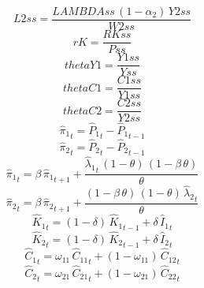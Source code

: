 \begin{dmath*}
L2ss = \frac{{LAMBDAss}\, \left(1-{{\alpha_{2}}}\right)\, {Y2ss}}{{W2ss}}
\end{dmath*}
\begin{dmath*}
rK = \frac{{RKss}}{{Pss}}
\end{dmath*}
\begin{dmath*}
thetaY1 = \frac{{Y1ss}}{{Yss}}
\end{dmath*}
\begin{dmath*}
thetaC1 = \frac{{C1ss}}{{Y1ss}}
\end{dmath*}
\begin{dmath*}
thetaC2 = \frac{{C2ss}}{{Y2ss}}
\end{dmath*}
\begin{dmath}
{{\hat{\pi}_{1}}}_{t}={{\hat{P}_{1}}}_{t}-{{\hat{P}_{1}}}_{t-1}
\end{dmath}
\begin{dmath}
{{\hat{\pi}_{2}}}_{t}={{\hat{P}_{2}}}_{t}-{{\hat{P}_{2}}}_{t-1}
\end{dmath}
\begin{dmath}
{{\hat{\pi}_{1}}}_{t}={{\beta}}\, {{\hat{\pi}_{1}}}_{t+1}+\frac{{{\hat{\lambda}_{1}}}_{t}\, \left(1-{{\theta}}\right)\, \left(1-{{\beta}}\, {{\theta}}\right)}{{{\theta}}}
\end{dmath}
\begin{dmath}
{{\hat{\pi}_{2}}}_{t}={{\beta}}\, {{\hat{\pi}_{2}}}_{t+1}+\frac{\left(1-{{\beta}}\, {{\theta}}\right)\, \left(1-{{\theta}}\right)\, {{\hat{\lambda}_{2}}}_{t}}{{{\theta}}}
\end{dmath}
\begin{dmath}
{{\hat{K}_{1}}}_{t}=\left(1-{{\delta}}\right)\, {{\hat{K}_{1}}}_{t-1}+{{\delta}}\, {{\hat{I}_{1}}}_{t}
\end{dmath}
\begin{dmath}
{{\hat{K}_{2}}}_{t}=\left(1-{{\delta}}\right)\, {{\hat{K}_{2}}}_{t-1}+{{\delta}}\, {{\hat{I}_{2}}}_{t}
\end{dmath}
\begin{dmath}
{{\hat{C}_{1}}}_{t}={{\omega_{11}}}\, {{\hat{C}_{1 1}}}_{t}+\left(1-{{\omega_{11}}}\right)\, {{\hat{C}_{1 2}}}_{t}
\end{dmath}
\begin{dmath}
{{\hat{C}_{2}}}_{t}={{\omega_{21}}}\, {{\hat{C}_{2 1}}}_{t}+\left(1-{{\omega_{21}}}\right)\, {{\hat{C}_{2 2}}}_{t}
\end{dmath}
